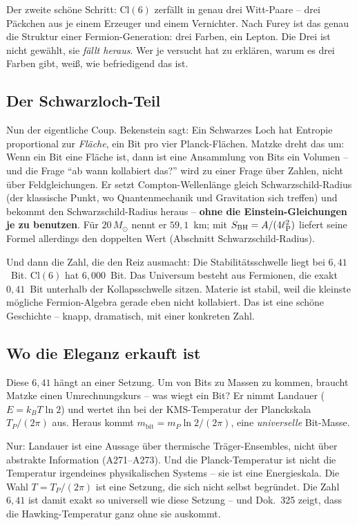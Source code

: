 Der zweite schöne Schritt: $\mathrm{Cl}(6)$ zerfällt in genau drei
Witt-Paare -- drei Päckchen aus je einem Erzeuger und einem Vernichter.
Nach Furey ist das genau die Struktur einer Fermion-Generation:
drei Farben, ein Lepton. Die Drei ist nicht gewählt, sie \emph{fällt
heraus}. Wer je versucht hat zu erklären, warum es drei Farben gibt,
weiß, wie befriedigend das ist.

\subsection*{Der Schwarzloch-Teil}

Nun der eigentliche Coup. Bekenstein sagt: Ein Schwarzes Loch hat
Entropie proportional zur \emph{Fläche}, ein Bit pro vier
Planck-Flächen. Matzke dreht das um: Wenn ein Bit eine Fläche ist,
dann ist eine Ansammlung von Bits ein Volumen -- und die Frage
\enquote{ab wann kollabiert das?} wird zu einer Frage über Zahlen,
nicht über Feldgleichungen. Er setzt Compton-Wellenlänge gleich
Schwarzschild-Radius (der klassische Punkt, wo Quantenmechanik und
Gravitation sich treffen) und bekommt den Schwarzschild-Radius heraus --
\textbf{ohne die Einstein-Gleichungen je zu benutzen}.
Für $20\,M_\odot$ nennt er $59{,}1$~km; mit $S_{\mathrm{BH}} = A/(4\ell_{\mathrm{P}}^2)$ liefert
seine Formel allerdings den doppelten Wert (Abschnitt Schwarzschild-Radius).

Und dann die Zahl, die den Reiz ausmacht: Die Stabilitätsschwelle liegt
bei $6{,}41$~Bit. $\mathrm{Cl}(6)$ hat $6{,}000$~Bit. Das Universum
besteht aus Fermionen, die exakt $0{,}41$~Bit unterhalb der
Kollapsschwelle sitzen. Materie ist stabil, weil die kleinste mögliche
Fermion-Algebra gerade eben nicht kollabiert. Das ist eine schöne
Geschichte -- knapp, dramatisch, mit einer konkreten Zahl.

\subsection*{Wo die Eleganz erkauft ist}

Diese $6{,}41$ hängt an einer Setzung. Um von Bits zu Massen zu kommen,
braucht Matzke einen Umrechnungskurs -- was wiegt ein Bit? Er nimmt
Landauer ($E = k_BT\ln 2$) und wertet ihn bei der KMS-Temperatur der Planckskala $T_P/(2\pi)$ aus.
Heraus kommt $m_{\mathrm{bit}} = m_P\ln 2/(2\pi)$, eine \emph{universelle}
Bit-Masse.

Nur: Landauer ist eine Aussage über thermische Träger-Ensembles, nicht
über abstrakte Information (A271--A273). Und die Planck-Temperatur ist
nicht die Temperatur irgendeines physikalischen Systems -- sie ist eine
Energieskala. Die Wahl $T = T_P/(2\pi)$ ist eine Setzung, die sich nicht selbst
begründet. Die Zahl $6{,}41$ ist damit exakt so universell wie diese
Setzung -- und Dok.~325 zeigt, dass die Hawking-Temperatur ganz ohne sie
auskommt.

